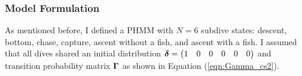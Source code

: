 
\subsubsection{Model Formulation}

As mentioned before, I defined a PHMM with $N = 6$ subdive states: descent, bottom, chase, capture, ascent without a fish, and ascent with a fish. I assumed that all dives shared an initial distribution $\boldsymbol{\delta} = \begin{pmatrix} 1 & 0 & 0 & 0 & 0 & 0 \end{pmatrix}$ and transition probability matrix $\boldsymbol{\Gamma}$ as shown in Equation (\ref{eqn:Gamma_cs2}).

